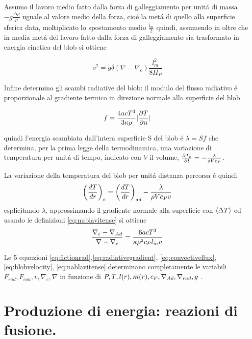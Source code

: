 \documentclass[../main.tex]{subfiles}
\begin{document}
Assumo il lavoro medio fatto dalla forza di galleggiamento per unit\'a di massa $-g\frac{\Delta\rho}{\rho}$ uguale al valore medio della forza, cio\'e la met\'a di quello alla superficie sferica data, moltiplicato lo spostamento medio $\frac{l_m}{2}$ quindi, assumendo in oltre che in media met\'a del lavoro fatto dalla forza di galleggiamento sia trasformato in energia cinetica del blob si ottiene

\begin{equation}
v^2=g\delta(\nabla-\nabla_e)\frac{l_m^2}{8H_P}\label{eq:blobvelocity}
\end{equation}

Infine determino gli scambi radiative del blob: il modulo del flusso radiativo \'e proporzionale al gradiente termico in direzione normale alla superficie del blob

\begin{equation}
f=\frac{4acT^3}{3\kappa\rho}|\PDy{n}{T}|
\end{equation}

quindi l'energia scambiata dall'intera superficie S del blob \'e $\lambda=Sf$ che determina, per la prima legge della termodinamica, una variazione di temperatura per unit\'a di tempo, indicato con $V$ il volume, $\PDy{t}{T_e}=-\frac{\lambda}{\rho Vc_P}$.

La variazione della temperatura del blob per unit\'a distanza percorsa \'e quindi
\begin{equation}
\Dcvar{\TDy{r}{T}}{e}=\Dcvar{\TDy{r}{T}}{ad}-\frac{\lambda}{\rho Vc_Pv}\label{eq:Tchangelength}
\end{equation}
esplicitando $\lambda$, approssimando il gradiente normale alla superficie con $\exv{\Delta T}$ ed usando le definizioni \eqref{eq:nablavitense} si ottiene
\begin{equation}
\frac{\nabla_e-\nad{}}{\nabla-\nabla_e}=\frac{6acT^3}{\kappa\rho^2c_Pl_mv}
\end{equation}

Le 5 equazioni \eqref{eq:fictionrad},\eqref{eq:radiativegradient}, \eqref{eq:convectiveflux}, \eqref{eq:blobvelocity}, \eqref{eq:nablavitense} determinano completamente le variabili $F_{rad}, F_{con}, v, \nabla_e, \nabla$ in funzione di $P,T,l(r),m(r),c_P,\nad{},\nrad{},g$ .


{\let\clearpage\relax\let\cleardoublepage\relax
\chapter{Produzione di energia: reazioni di fusione.}
}
\end{document}
